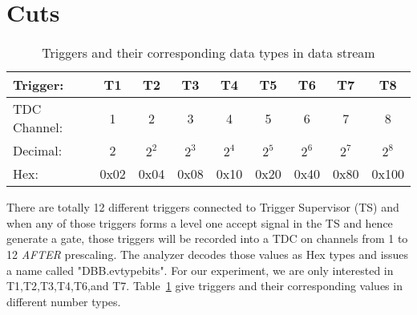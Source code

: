 \documentclass[a4paper,10.5pt]{article}
\begin{document}
\section{Cuts}

\begin{table}[htbp]
 \begin{tabular}{lcccccccc}
 \toprule
 Trigger:       &    T1   &   T2   &   T3   &   T4   &   T5   &   T6   &   T7   &   T8\\
 \midrule
 TDC Channel:   &     1   &    2   &    3   &    4   &    5   &    6   &    7   &    8\\
 Decimal:       &     2   &   $2^{2}$   &    $2^{3}$   &   $2^{4}$   &   $2^{5}$   &  $2^{6}$  &   $2^{7}$  &   $2^{8}$\\
 Hex:           &    0x02 &   0x04 &   0x08 &   0x10 &  0x20  &  0x40  &  0x80  &  0x100\\
 \bottomrule
 \end{tabular}
\caption{Triggers and their corresponding data types in data stream}
\label{trigger_table}
\end{table}

 There are totally 12 different triggers connected to Trigger Supervisor (TS) and when any of those triggers forms a level one accept signal in the TS and hence generate a gate, those triggers  will be recorded into a TDC on channels from 1 to 12 \emph{AFTER} prescaling. The analyzer decodes those values as Hex types and issues a name called "DBB.evtypebits". For our experiment, we are only interested in T1,T2,T3,T4,T6,and T7. Table~\ref{trigger_table} give triggers and their corresponding values in different number types.
\end{document}
